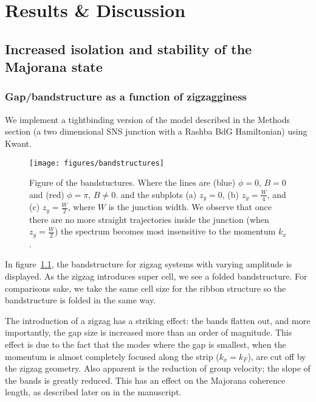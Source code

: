 \chapter{Results \& Discussion}
	\section{Increased isolation and stability of the Majorana state}

		\subsection{Gap/bandstructure as a function of zigzagginess}
			We implement a tightbinding version of the model described in the Methods section (a two dimensional SNS junction with a Rashba BdG Hamiltonian) using Kwant.

			\begin{figure}[!htb]
			\centering
			\texttt{[image: figures/bandstructures]}
			\caption{Figure of the bandstuctures.
			Where the lines are (blue) $\phi=0$, $B=0$ and (red) $\phi=\pi$, $B \ne 0$.
			and the subplots (a) $z_y=0$, (b) $z_y=\frac{W}{4}$, and (c) $z_y=\frac{W}{2}$, where $W$ is the junction width.
			We observe that once there are no more straight trajectories inside the junction (when $z_y=\frac{W}{2}$) the spectrum becomes most insensitive to the momentum $k_x$.
			\label{fig:bandstuctures}}
			\end{figure}

			In figure~\ref{fig:bandstuctures}, the bandstructure for zigzag systems with varying amplitude is displayed.
			As the zigzag introduces super cell, we see a folded bandstructure.
			For comparisons sake, we take the same cell size for the ribbon structure so the bandstructure is folded in the same way.

			The introduction of a zigzag has a striking effect: the bands flatten out, and more importantly, the gap size is increased more than an order of magnitude.
			This effect is due to the fact that the modes where the gap is smallest, when the momentum is almost completely focused along the strip ($k_x=k_F$), are cut off by the zigzag geometry.
			Also apparent is the reduction of group velocity; the slope of the bands is greatly reduced.
			This has an effect on the Majorana coherence length, as described later on in the manuscript.

